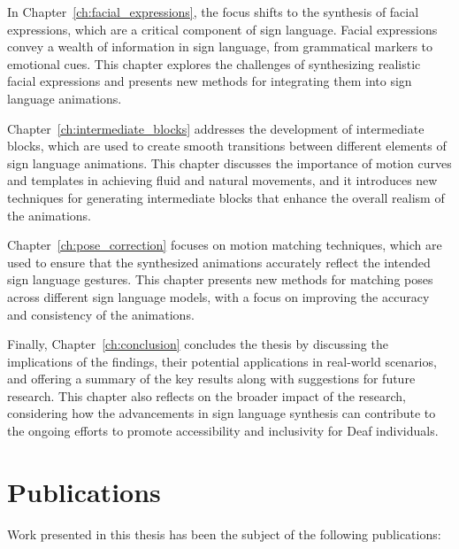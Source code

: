 \documentclass[../../main.tex]{subfiles}
\begin{document}
In Chapter~\ref{ch:facial_expressions}, the focus shifts to the synthesis of facial expressions, which are a critical component of sign language. Facial expressions convey a wealth of information in sign language, from grammatical markers to emotional cues. This chapter explores the challenges of synthesizing realistic facial expressions and presents new methods for integrating them into sign language animations.

Chapter~\ref{ch:intermediate_blocks} addresses the development of intermediate blocks, which are used to create smooth transitions between different elements of sign language animations. This chapter discusses the importance of motion curves and templates in achieving fluid and natural movements, and it introduces new techniques for generating intermediate blocks that enhance the overall realism of the animations.

Chapter~\ref{ch:pose_correction} focuses on motion matching techniques, which are used to ensure that the synthesized animations accurately reflect the intended sign language gestures. This chapter presents new methods for matching poses across different sign language models, with a focus on improving the accuracy and consistency of the animations.

Finally, Chapter~\ref{ch:conclusion} concludes the thesis by discussing the implications of the findings, their potential applications in real-world scenarios, and offering a summary of the key results along with suggestions for future research. This chapter also reflects on the broader impact of the research, considering how the advancements in sign language synthesis can contribute to the ongoing efforts to promote accessibility and inclusivity for Deaf individuals.

\section{Publications}

Work presented in this thesis has been the subject of the following publications:
\end{document}
